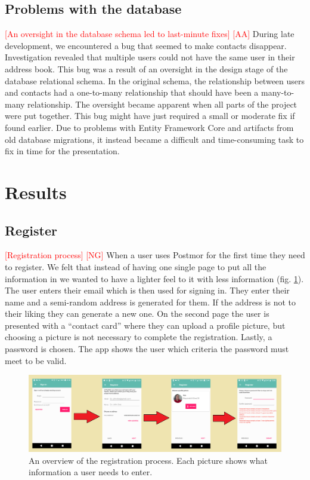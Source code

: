 \documentclass[acmlarge, review=false, screen=true]{acmart}
\begin{document}
    \subsection{Problems with the database}
      \textcolor{red}{[An oversight in the database schema led to last-minute fixes] [AA]} \newline
      During late development, we encountered a bug that seemed to make contacts disappear. Investigation revealed that multiple users could not have the same user in their address book. This bug was a result of an oversight in the design stage of the database relational schema. In the original schema, the relationship between users and contacts had a one-to-many relationship that should have been a many-to-many relationship. The oversight became apparent when all parts of the project were put together. This bug might have just required a small or moderate fix if found earlier. Due to problems with Entity Framework Core\cite{adodotnet} and artifacts from old database migrations, it instead became a difficult and time-consuming task to fix in time for the presentation.

  
  \section{Results}

    \subsection{Register}
      \textcolor{red}{[Registration process] [NG]} \newline
      When a user uses Postmor for the first time they need to register. We felt that instead of having one single page to put all the information in we wanted to have a lighter feel to it with less information (fig. \ref{fig:register}). The user enters their email which is then used for signing in. They enter their name and a semi-random address is generated for them. If the address is not to their liking they can generate a new one. On the second page the user is presented with a “contact card” where they can upload a profile picture, but choosing a picture is not necessary to complete the registration. Lastly, a password is chosen. The app shows the user which criteria the password must meet to be valid.

      \begin{figure}
        \includegraphics[width=\textwidth]{images/LOGIN-REGISTER.png}
        \caption{An overview of the registration process. Each picture shows what information a user needs to enter.}
        \label{fig:register}
      \end{figure}
\end{document}
